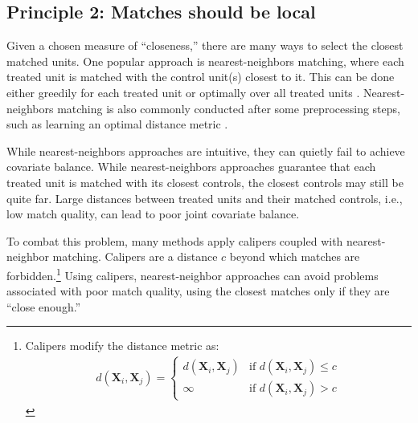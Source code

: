 \documentclass{article}
\newcommand{\bX}{\mathbf{X}}
\begin{document}


\subsection{Principle 2: Matches should be local}
\label{sec:close}

Given a chosen measure of ``closeness,'' there are many ways to select the closest matched units.
One popular approach is nearest-neighbors matching, where each treated unit is matched with the control unit(s) closest to it.
This can be done either greedily for each treated unit \citep{rubin1973matching} or optimally over all treated units \citep{rosenbaum1989optimal}.
Nearest-neighbors matching is also commonly conducted after some preprocessing steps, such as learning an optimal distance metric \citep{diamond2013genetic, parikh2022malts}.

While nearest-neighbors approaches are intuitive, they can quietly fail to achieve covariate balance.
While nearest-neighbors approaches guarantee that each treated unit is matched with its closest controls, the closest controls may still be quite far.
Large distances between treated units and their matched controls, i.e., low match quality, can lead to poor joint covariate balance.

To combat this problem, many methods apply calipers coupled with nearest-neighbor matching.
Calipers are a distance $c$ beyond which matches are forbidden.\footnote{Calipers modify the distance metric as:
\begin{align*}
    d(\bX_i, \bX_j) = 
    \begin{cases}
        d(\bX_i, \bX_j) &\text{if } d(\bX_i, \bX_j) \leq c \\
        \infty &\text{if } d(\bX_i, \bX_j) > c
    \end{cases}
\end{align*}}
Using calipers, nearest-neighbor approaches can avoid problems associated with poor match quality, using the closest matches only if they are ``close enough.''
\end{document}
